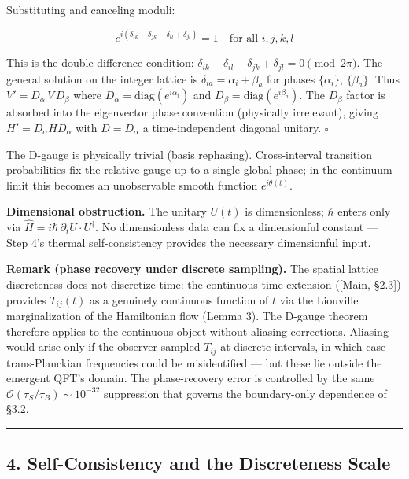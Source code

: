 \documentclass[
]{article}
\begin{document}
Substituting and canceling moduli:

\[e^{i(\delta_{ik} - \delta_{jk} - \delta_{il} + \delta_{jl})} = 1 \quad \text{for all } i, j, k, l\]

This is the double-difference condition:
\(\delta_{ik} - \delta_{il} - \delta_{jk} + \delta_{jl} = 0 \pmod{2\pi}\).
The general solution on the integer lattice is
\(\delta_{ia} = \alpha_i + \beta_a\) for phases \(\{\alpha_i\}\),
\(\{\beta_a\}\). Thus \(V' = D_\alpha \, V \, D_\beta\) where
\(D_\alpha = \text{diag}(e^{i\alpha_i})\) and
\(D_\beta = \text{diag}(e^{i\beta_a})\). The \(D_\beta\) factor is
absorbed into the eigenvector phase convention (physically irrelevant),
giving \(H' = D_\alpha H D_\alpha^\dagger\) with \(D = D_\alpha\) a
time-independent diagonal unitary. \(\square\)

The D-gauge is physically trivial (basis rephasing). Cross-interval
transition probabilities fix the relative gauge up to a single global
phase; in the continuum limit this becomes an unobservable smooth
function \(e^{i\theta(t)}\).

\textbf{Dimensional obstruction.} The unitary \(U(t)\) is dimensionless;
\(\hbar\) enters only via
\(\hat{H} = i\hbar \, \partial_t U \cdot U^\dagger\). No dimensionless
data can fix a dimensionful constant --- Step 4's thermal
self-consistency provides the necessary dimensionful input.

\textbf{Remark (phase recovery under discrete sampling).} The spatial
lattice discreteness does not discretize time: the continuous-time
extension ({[}Main, §2.3{]}) provides \(T_{ij}(t)\) as a genuinely
continuous function of \(t\) via the Liouville marginalization of the
Hamiltonian flow (Lemma 3). The D-gauge theorem therefore applies to the
continuous object without aliasing corrections. Aliasing would arise
only if the observer sampled \(T_{ij}\) at discrete intervals, in which
case trans-Planckian frequencies could be misidentified --- but these
lie outside the emergent QFT's domain. The phase-recovery error is
controlled by the same \(\mathcal{O}(\tau_S/\tau_B) \sim 10^{-32}\)
suppression that governs the boundary-only dependence of §3.2.

\begin{center}\rule{0.5\linewidth}{0.5pt}\end{center}

\hypertarget{self-consistency-and-the-discreteness-scale}{%
\subsection{4. Self-Consistency and the Discreteness
Scale}\label{self-consistency-and-the-discreteness-scale}}
\end{document}
